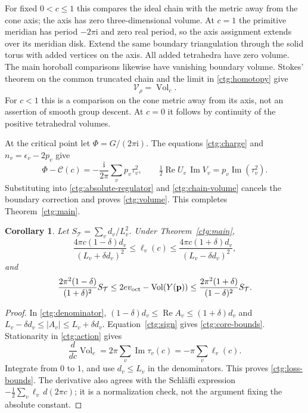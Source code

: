 \documentclass[11pt]{article}
\numberwithin{equation}{section}
\newtheorem{corollary}[theorem]{Corollary}
\theoremstyle{definition}
\theoremstyle{remark}
\newcommand{\ii}{\mathrm i}
\newcommand{\Rea}{\operatorname{Re}}
\newcommand{\Ima}{\operatorname{Im}}
\newcommand{\Vol}{\operatorname{Vol}}
\newcommand{\calC}{\mathcal C}
\begin{document}
For fixed $0<c\le1$ this compares the ideal chain with the metric
away from the cone axis; the axis has zero three-dimensional volume.
At $c=1$ the primitive meridian has period $-2\pi\ii$ and
zero real period, so the axis assignment extends over its meridian
disk. Extend the same boundary triangulation through the solid torus
with added vertices on the axis. All added tetrahedra have zero
volume. The main horoball comparisons likewise have vanishing
boundary volume. Stokes' theorem on the common truncated chain and
the limit in \eqref{ctg:homotopy} give
\begin{equation}\label{ctg:chain-volume}
 \mathcal V_\rho=\Vol_c.
\end{equation}
For $c<1$ this is a comparison on the cone metric away from its axis,
not an assertion of smooth group descent. At $c=0$ it follows by
continuity of the positive tetrahedral volumes.

At the critical point let $\Phi=G/(2\pi\ii)$. The equations
\eqref{ctg:charge} and $n_v=\epsilon_v-2p_v$ give
\begin{equation}\label{ctg:cancellation}
 \Phi-\calC(c)=-\frac{\ii}{2\pi}\sum_vp_v\tau_v^2,
 \qquad
 \tfrac12\Rea U_v\,\Ima V_v=p_v\Ima(\tau_v^2).
\end{equation}
Substituting into \eqref{ctg:absolute-regulator} and
\eqref{ctg:chain-volume} cancels the boundary correction and proves
\eqref{ctg:volume}. This completes Theorem~\ref{ctg:main}.

\begin{corollary}\label{ctg:quantitative-volume}
Let $S_{\mathcal T}=\sum_v d_v/L_v^2$. Under Theorem~\ref{ctg:main},
\begin{equation}\label{ctg:core-bounds}
 \frac{4\pi c(1-\delta)d_v}{(L_v+\delta d_v)^2}
 \le\ell_v(c)\le
 \frac{4\pi c(1+\delta)d_v}{(L_v-\delta d_v)^2},
\end{equation}
and
\begin{equation}\label{ctg:loss-bounds}
 \frac{2\pi^2(1-\delta)}{(1+\delta)^2}S_{\mathcal T}
 \le 2e v_{\rm oct}-\Vol(Y(\mathbf p))\le
 \frac{2\pi^2(1+\delta)}{(1-\delta)^2}S_{\mathcal T}.
\end{equation}
\end{corollary}
\begin{proof}
In \eqref{ctg:denominator},
$(1-\delta)d_v\le\Rea A_v\le(1+\delta)d_v$ and
$L_v-\delta d_v\le|A_v|\le L_v+\delta d_v$.
Equation~\eqref{ctg:sign} gives \eqref{ctg:core-bounds}.
Stationarity in \eqref{ctg:action} gives
\[
 \frac{d}{dc}\Vol_c=2\pi\sum_v\Ima\tau_v(c)
                         =-\pi\sum_v\ell_v(c).
\]
Integrate from $0$ to $1$, and use $d_v\le L_v$ in the
denominators. This proves \eqref{ctg:loss-bounds}.
The derivative also agrees with the Schläfli expression
$-\tfrac12\sum_v\ell_v\,d(2\pi c)$; it is a normalization check,
not the argument fixing the absolute constant.
\end{proof}
\end{document}

